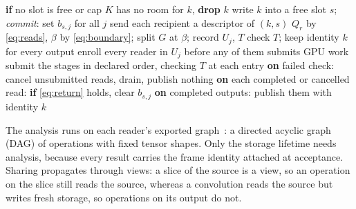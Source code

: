 \documentclass[conference]{IEEEtran}
\newcommand{\sys}{REALBIM}
\begin{document}
\begin{algorithm}[t]
\caption{\sys{} per frame: BIM's publication and ReadSeal's plan and invocation. $b_{s,j}$: borrow bit of recipient $j$ on slot $s$; $U_j$: readers of $j$; $T$: binding tokens.}
\label{alg:readseal}
\footnotesize
\begin{algorithmic}[1]
\State \textbf{if} no slot is free or cap $K$ has no room for $k$, \textbf{drop} $k$
\State write $k$ into a free slot $s$; \emph{commit}: set $b_{s,j}$ for all $j$
\State send each recipient a descriptor of $(k,s)$
\EndProcedure
{}
\State $Q_r$ by \eqref{eq:reads}, $\beta$ by \eqref{eq:boundary}; split $G$ at $\beta$; record $U_j$, $T$
\EndProcedure
{}
\State check $T$; keep identity $k$ for every output
\State enroll every reader in $U_j$ before any of them submits GPU work
\State submit the stages in declared order, checking $T$ at each entry
\State \textbf{on} failed check: cancel unsubmitted reads, drain, publish nothing
\State \textbf{on} each completed or cancelled read: \textbf{if} \eqref{eq:return} holds, clear $b_{s,j}$
\State \textbf{on} completed outputs: publish them with identity $k$
\EndProcedure
\end{algorithmic}
\end{algorithm}

The analysis runs on each reader's exported graph~\cite{pytorch2}: a directed acyclic graph (DAG) of operations with fixed tensor shapes. Only the storage lifetime needs analysis, because every result carries the frame identity attached at acceptance. Sharing propagates through views: a slice of the source is a view, so an operation on the slice still reads the source, whereas a convolution reads the source but writes fresh storage, so operations on its output do not.
\end{document}
